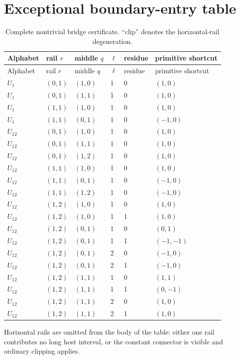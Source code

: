 \documentclass[11pt]{article}
\theoremstyle{definition}
\begin{document}
\section{Exceptional boundary-entry table}\label{app:bridges}
\begin{longtable}{llllll}
\caption{Complete nontrivial bridge certificate.  ``clip'' denotes the horizontal-rail degeneration.}\label{tab:bridge-full}\\
\toprule
Alphabet & rail $r$ & middle $q$ & $\ell$ & residue & primitive shortcut\\
\midrule
\endfirsthead
\toprule
Alphabet & rail $r$ & middle $q$ & $\ell$ & residue & primitive shortcut\\
\midrule
\endhead
$U_1$ & $(0,1)$ & $(1,0)$ & 1 & 0 & $(1,0)$\\
$U_1$ & $(0,1)$ & $(1,1)$ & 1 & 0 & $(1,0)$\\
$U_1$ & $(1,1)$ & $(1,0)$ & 1 & 0 & $(1,0)$\\
$U_1$ & $(1,1)$ & $(0,1)$ & 1 & 0 & $(-1,0)$\\
$U_{12}$ & $(0,1)$ & $(1,0)$ & 1 & 0 & $(1,0)$\\
$U_{12}$ & $(0,1)$ & $(1,1)$ & 1 & 0 & $(1,0)$\\
$U_{12}$ & $(0,1)$ & $(1,2)$ & 1 & 0 & $(1,0)$\\
$U_{12}$ & $(1,1)$ & $(1,0)$ & 1 & 0 & $(1,0)$\\
$U_{12}$ & $(1,1)$ & $(0,1)$ & 1 & 0 & $(-1,0)$\\
$U_{12}$ & $(1,1)$ & $(1,2)$ & 1 & 0 & $(-1,0)$\\
$U_{12}$ & $(1,2)$ & $(1,0)$ & 1 & 0 & $(1,0)$\\
$U_{12}$ & $(1,2)$ & $(1,0)$ & 1 & 1 & $(1,0)$\\
$U_{12}$ & $(1,2)$ & $(0,1)$ & 1 & 0 & $(0,1)$\\
$U_{12}$ & $(1,2)$ & $(0,1)$ & 1 & 1 & $(-1,-1)$\\
$U_{12}$ & $(1,2)$ & $(0,1)$ & 2 & 0 & $(-1,0)$\\
$U_{12}$ & $(1,2)$ & $(0,1)$ & 2 & 1 & $(-1,0)$\\
$U_{12}$ & $(1,2)$ & $(1,1)$ & 1 & 0 & $(1,1)$\\
$U_{12}$ & $(1,2)$ & $(1,1)$ & 1 & 1 & $(0,-1)$\\
$U_{12}$ & $(1,2)$ & $(1,1)$ & 2 & 0 & $(1,0)$\\
$U_{12}$ & $(1,2)$ & $(1,1)$ & 2 & 1 & $(1,0)$\\
\bottomrule
\end{longtable}
Horizontal rails are omitted from the body of the table: either one rail contributes no long host interval, or the constant connector is visible and ordinary clipping applies.
\end{document}
